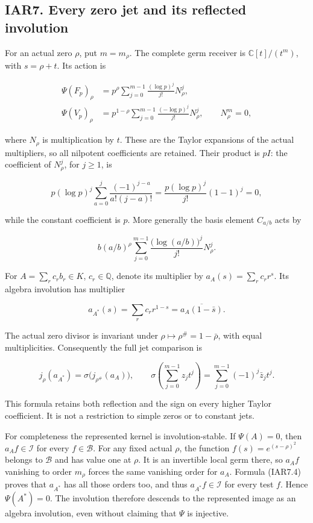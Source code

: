\documentclass[
]{article}
\begin{document}
\subsection{IAR7. Every zero jet and its reflected
involution}\label{iar7.-every-zero-jet-and-its-reflected-involution}

For an actual zero \(\rho\), put \(m=m_\rho\). The complete germ
receiver is \(\mathbb C[t]/(t^m)\), with \(s=\rho+t\). Its action is

\[
\begin{aligned}
\Psi(F_p)_\rho
&=p^\rho\sum_{j=0}^{m-1}\frac{(\log p)^j}{j!}N_\rho^j,\\
\Psi(V_p)_\rho
&=p^{1-\rho}\sum_{j=0}^{m-1}\frac{(-\log p)^j}{j!}N_\rho^j,
\qquad N_\rho^m=0,
\end{aligned}
\tag{IAR7.1}
\]

where \(N_\rho\) is multiplication by \(t\). These are the Taylor
expansions of the actual multipliers, so all nilpotent coefficients are
retained. Their product is \(pI\): the coefficient of \(N_\rho^j\), for
\(j\ge1\), is

\[
p(\log p)^j\sum_{a=0}^j\frac{(-1)^{j-a}}{a!(j-a)!}
=\frac{p(\log p)^j}{j!}(1-1)^j=0,
\]

while the constant coefficient is \(p\). More generally the basis
element \(C_{a/b}\) acts by

\[
b(a/b)^\rho
\sum_{j=0}^{m-1}\frac{\bigl(\log(a/b)\bigr)^j}{j!}N_\rho^j.
\tag{IAR7.2}
\]

For \(A=\sum_r c_r b_r\in K\), \(c_r\in\mathbb Q\), denote its
multiplier by \(a_A(s)=\sum_r c_r r^s\). Its algebra involution has
multiplier

\[
a_{A^*}(s)=\sum_r c_r r^{1-s}
=\overline{a_A(1-\bar s)}.
\tag{IAR7.3}
\]

The actual zero divisor is invariant under
\(\rho\mapsto\rho^\#=1-\bar\rho\), with equal multiplicities.
Consequently the full jet comparison is

\[
j_\rho(a_{A^*})
=\sigma\bigl(j_{\rho^\#}(a_A)\bigr),
\qquad
\sigma\left(\sum_{j=0}^{m-1}z_jt^j\right)
=\sum_{j=0}^{m-1}(-1)^j\bar z_jt^j.
\tag{IAR7.4}
\]

This formula retains both reflection and the sign on every higher Taylor
coefficient. It is not a restriction to simple zeros or to constant
jets.

For completeness the represented kernel is involution-stable. If
\(\Psi(A)=0\), then \(a_A f\in\mathcal I\) for every \(f\in\mathcal B\).
For any fixed actual \(\rho\), the function \(f(s)=e^{(s-\rho)^2}\)
belongs to \(\mathcal B\) and has value one at \(\rho\). It is an
invertible local germ there, so \(a_A f\) vanishing to order \(m_\rho\)
forces the same vanishing order for \(a_A\). Formula (IAR7.4) proves
that \(a_{A^*}\) has all those orders too, and thus
\(a_{A^*}f\in\mathcal I\) for every test \(f\). Hence \(\Psi(A^*)=0\).
The involution therefore descends to the represented image as an algebra
involution, even without claiming that \(\Psi\) is injective.
\end{document}
